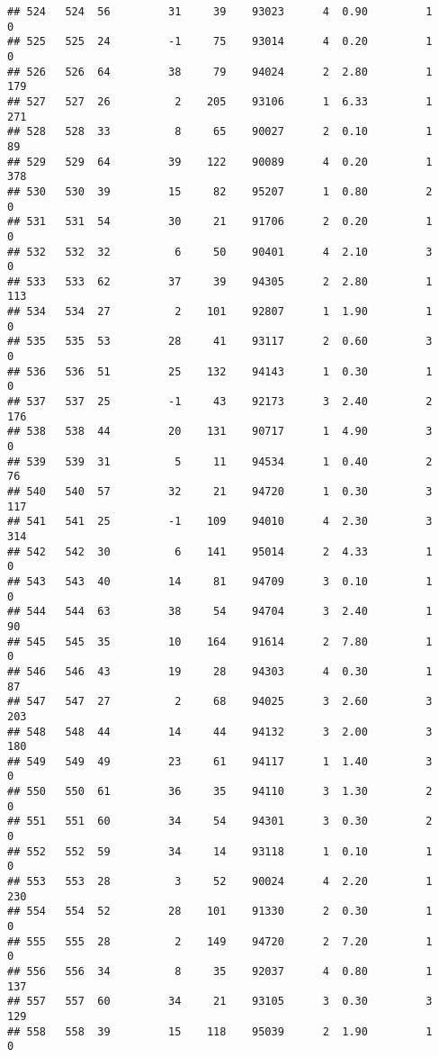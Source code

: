 \documentclass[
]{article}
\begin{document}
\begin{verbatim}
## 524   524  56         31     39    93023      4  0.90         1        0
## 525   525  24         -1     75    93014      4  0.20         1        0
## 526   526  64         38     79    94024      2  2.80         1      179
## 527   527  26          2    205    93106      1  6.33         1      271
## 528   528  33          8     65    90027      2  0.10         1       89
## 529   529  64         39    122    90089      4  0.20         1      378
## 530   530  39         15     82    95207      1  0.80         2        0
## 531   531  54         30     21    91706      2  0.20         1        0
## 532   532  32          6     50    90401      4  2.10         3        0
## 533   533  62         37     39    94305      2  2.80         1      113
## 534   534  27          2    101    92807      1  1.90         1        0
## 535   535  53         28     41    93117      2  0.60         3        0
## 536   536  51         25    132    94143      1  0.30         1        0
## 537   537  25         -1     43    92173      3  2.40         2      176
## 538   538  44         20    131    90717      1  4.90         3        0
## 539   539  31          5     11    94534      1  0.40         2       76
## 540   540  57         32     21    94720      1  0.30         3      117
## 541   541  25         -1    109    94010      4  2.30         3      314
## 542   542  30          6    141    95014      2  4.33         1        0
## 543   543  40         14     81    94709      3  0.10         1        0
## 544   544  63         38     54    94704      3  2.40         1       90
## 545   545  35         10    164    91614      2  7.80         1        0
## 546   546  43         19     28    94303      4  0.30         1       87
## 547   547  27          2     68    94025      3  2.60         3      203
## 548   548  44         14     44    94132      3  2.00         3      180
## 549   549  49         23     61    94117      1  1.40         3        0
## 550   550  61         36     35    94110      3  1.30         2        0
## 551   551  60         34     54    94301      3  0.30         2        0
## 552   552  59         34     14    93118      1  0.10         1        0
## 553   553  28          3     52    90024      4  2.20         1      230
## 554   554  52         28    101    91330      2  0.30         1        0
## 555   555  28          2    149    94720      2  7.20         1        0
## 556   556  34          8     35    92037      4  0.80         1      137
## 557   557  60         34     21    93105      3  0.30         3      129
## 558   558  39         15    118    95039      2  1.90         1        0

\end{verbatim}
\end{document}
